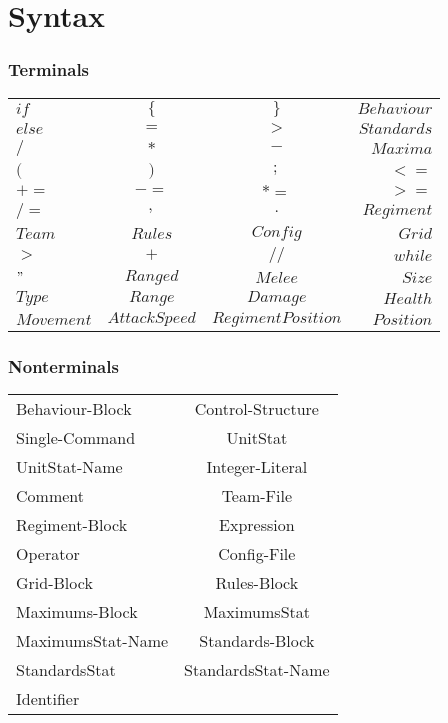 \section{Syntax}
	\subsubsection{Terminals}
		
		\begin{tabular}{ l c c r}
			$if  	 $& $\{ 	 $&$ \} 	  $&$ Behaviour$  \\
		  	$else	 $&$ = 		 $&$ >  	  $&$ Standards$  \\
		 	$/ 		 $&$ *  	 $&$ -  	  $&$ Maxima$	  \\
		 	$( 		 $&$ )  	 $&$ ;  	  $&$ < =$		  \\
		 	$+= 	 $&$ -=   	 $&$ *= 	  $&$ > =$	    \\
		 	$/= 	 $&$ ,     	 $&$ .  	  $&$ Regiment$   \\
			$Team	 $&$ Rules   $&$ Config   $&$ Grid$	   \\
			$>		 $&$   + 	 $&$ //	 	  $&$ while $   \\
			$ "		 $&$ Ranged  $&$   Melee  $&$ Size	$	\\
			$ Type	 $&$ Range  $&$   Damage  $&$ Health	$	\\		
			$ Movement $&$ AttackSpeed  $&$   RegimentPosition  $&$ Position	$	\\	
		\end{tabular}
	\subsubsection{Nonterminals}
		\begin{tabular}{l c}
			Behaviour-Block   & Control-Structure   \\
			Single-Command    & UnitStat 			\\
			UnitStat-Name	  & Integer-Literal		\\
			Comment			  & Team-File 			\\
			Regiment-Block	  & Expression			\\
			Operator		  & Config-File			\\
			Grid-Block	      & Rules-Block 		\\
			Maximums-Block	  & MaximumsStat		\\
			MaximumsStat-Name & Standards-Block	 	\\
			StandardsStat	  & StandardsStat-Name 	\\
			Identifier		  & 					\\
		\end{tabular}
	
